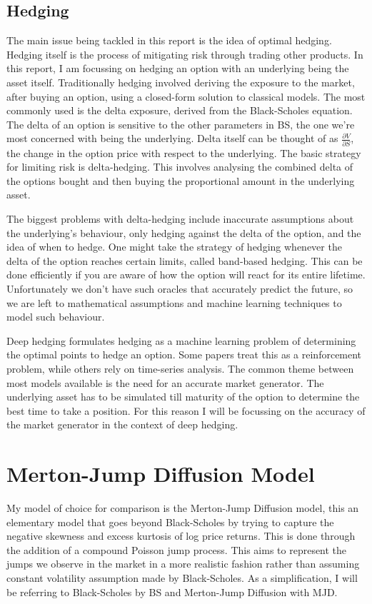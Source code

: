 \documentclass[12pt]{article}
\newcommand{\newp}
    {
    \vskip 0.5cm 
  }
\numberwithin{equation}{section}
\begin{document}
\subsection{Hedging}
The main issue being tackled in this report is the idea of optimal hedging. 
Hedging itself is the process of mitigating risk through trading other products. 
In this report, I am focussing on hedging an option with an underlying being the 
asset itself. Traditionally hedging involved deriving the exposure to the market, 
after buying an option, using a closed-form solution to classical models. The most 
commonly used is the delta exposure, derived from the Black-Scholes equation. 
The delta of an option is sensitive to the other parameters in BS, the one we're 
most concerned with being the underlying. Delta itself can be thought of as 
$\frac{\partial V}{\partial S}$, the change in the option price with respect to 
the underlying. 
The basic strategy for limiting risk is delta-hedging. This involves analysing 
the combined delta of the options bought and then buying the proportional amount 
in the underlying asset. 
\newp 
The biggest problems with delta-hedging include inaccurate assumptions about the 
underlying's behaviour, only hedging against the delta of the option, and the idea 
of when to hedge. One might take the strategy of hedging whenever the delta of 
the option reaches certain limits, called band-based hedging. This can be done 
efficiently if you are aware of how the option will react for its entire lifetime. 
Unfortunately we don't have such oracles that accurately predict the future, so 
we are left to mathematical assumptions and machine learning techniques to 
model such behaviour. 
\newp 
Deep hedging formulates hedging as a machine learning problem of determining the 
optimal points to hedge an option. Some papers treat this as a reinforcement 
problem, while others rely on time-series analysis. The common theme between 
most models available is the need for an accurate market generator. The underlying 
asset has to be simulated till maturity of the option to determine the best time 
to take a position. For this reason I will be focussing on the accuracy of the 
market generator in the context of deep hedging. 
\clearpage

\section{Merton-Jump Diffusion Model}
My model of choice for comparison is the Merton-Jump Diffusion model, this an 
elementary model that goes beyond Black-Scholes by trying to capture the negative
skewness and excess kurtosis of log price returns. This is done through the 
addition of a compound Poisson jump process. This aims to represent the jumps 
we observe in the market in a more realistic fashion rather than assuming constant 
volatility assumption made by Black-Scholes. As a simplification, I will be referring 
to Black-Scholes by BS and Merton-Jump Diffusion with MJD.
\end{document}
